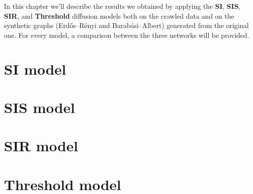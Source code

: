 In this chapter we'll describe the results we obtained by applying the \textbf{SI}, \textbf{SIS}, \textbf{SIR},
and \textbf{Threshold} diffusion models both on the crawled data and on the synthetic graphs (Erdős–Rényi and
Barabási–Albert) generated from the original one. For every model, a comparison between the three networks will be
provided.

\section{SI model} %
\label{sec:si_model}


\section{SIS model} %
\label{sec:sis_model}


\section{SIR model} %
\label{sec:sir_model}


\section{Threshold model} %
\label{sec:threshold_model}

